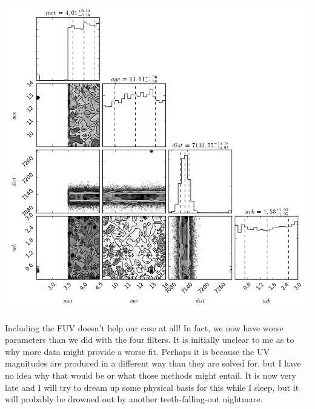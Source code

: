 \documentclass[letterpaper,12pt]{article}
\begin{document}
\includegraphics[width=5.5in]{corner41}

Including the FUV doesn't help our case at all! In fact, we now have worse parameters than we did with the four filters. It is initially unclear to me as to why more data might provide a worse fit. Perhaps it is because the UV magnitudes are produced in a different way than they are solved for, but I have no idea why that would be or what those methods might entail. It is now very late and I will try to dream up some physical basis for this while I sleep, but it will probably be drowned out by another teeth-falling-out nightmare.
\end{document}
